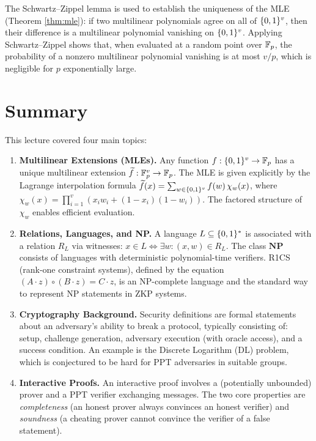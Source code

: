 \documentclass[11pt]{article}
\begin{document}
\begin{remark}
The Schwartz--Zippel lemma is used to establish the uniqueness of the MLE (Theorem
\ref{thm:mle}): if two multilinear polynomials agree on all of $\{0,1\}^v$, then their
difference is a multilinear polynomial vanishing on $\{0,1\}^v$.
Applying Schwartz--Zippel shows that, when evaluated at a random point over $\mathbb{F}_p$,
the probability of a nonzero multilinear polynomial vanishing is at most $v/p$, which is
negligible for $p$ exponentially large.
\end{remark}

\section*{Summary}

This lecture covered four main topics:

\begin{enumerate}[leftmargin=2em]
  \item \textbf{Multilinear Extensions (MLEs).}
        Any function $f : \{0,1\}^v \to \mathbb{F}_p$ has a unique multilinear extension
        $\widetilde{f} : \mathbb{F}_p^v \to \mathbb{F}_p$.  The MLE is given explicitly by
        the Lagrange interpolation formula
        $\widetilde{f}(x) = \sum_{w \in \{0,1\}^v} f(w)\,\chi_w(x)$,
        where $\chi_w(x) = \prod_{i=1}^v (x_i w_i + (1-x_i)(1-w_i))$.
        The factored structure of $\chi_w$ enables efficient evaluation.

  \item \textbf{Relations, Languages, and NP.}
        A language $L \subseteq \{0,1\}^*$ is associated with a relation $R_L$ via
        witnesses: $x \in L \iff \exists w : (x,w) \in R_L$.
        The class $\mathbf{NP}$ consists of languages with deterministic polynomial-time
        verifiers.
        R1CS (rank-one constraint systems), defined by the equation
        $(A \cdot z) \circ (B \cdot z) = C \cdot z$, is an NP-complete language and
        the standard way to represent NP statements in ZKP systems.

  \item \textbf{Cryptography Background.}
        Security definitions are formal statements about an adversary's ability to break
        a protocol, typically consisting of: setup, challenge generation, adversary
        execution (with oracle access), and a success condition.
        An example is the Discrete Logarithm (DL) problem, which is conjectured to be
        hard for PPT adversaries in suitable groups.

  \item \textbf{Interactive Proofs.}
        An interactive proof involves a (potentially unbounded) prover and a PPT verifier
        exchanging messages.
        The two core properties are \emph{completeness} (an honest prover always convinces
        an honest verifier) and \emph{soundness} (a cheating prover cannot convince the
        verifier of a false statement).
\end{enumerate}
\end{document}
